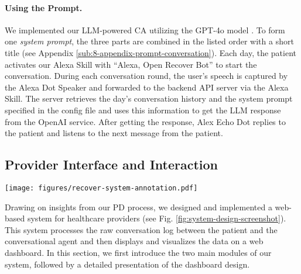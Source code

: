 \paragraph{Using the Prompt.}
\label{subsub:3-using-prompt}
We implemented our LLM-powered CA utilizing the GPT-4o model \cite{openaiGPT4TechnicalReport2023}. To form one \textit{system prompt}, the three parts are combined in the listed order with a short title (see Appendix \ref{sub:8-appendix-prompt-conversation}). Each day, the patient activates our Alexa Skill with ``Alexa, Open Recover Bot'' to start the conversation. During each conversation round, the user's speech is captured by the Alexa Dot Speaker and forwarded to the backend API server via the Alexa Skill. 
The server retrieves the day's conversation history and the system prompt specified in the config file and uses this information to get the LLM response from the OpenAI service. After getting the response, Alex Echo Dot replies to the patient and listens to the next message from the patient.

\subsection{Provider Interface and Interaction}
\label{sec:4-provider}
\begin{figure*}
    \centering
    \texttt{[image: figures/recover-system-annotation.pdf]}
    \captionsetup{justification=centerlast}
    \caption{}
    \label{fig:system-design-screenshot}
\end{figure*}
Drawing on insights from our PD process, we designed and implemented a web-based system for healthcare providers (see Fig. \ref{fig:system-design-screenshot}). This system processes the raw conversation log between the patient and the conversational agent and then displays and visualizes the data on a web dashboard.
In this section, we first introduce the two main modules of our system, followed by a detailed presentation of the dashboard design.



